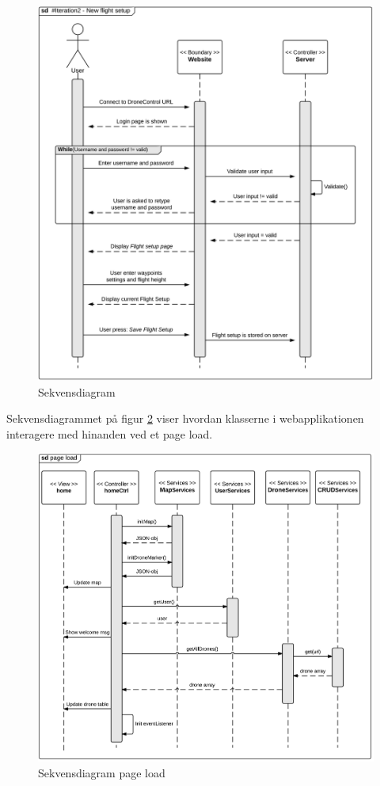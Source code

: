 \begin{figure}[H]
	\centering
	\includegraphics[width=1\textwidth]{Billeder/sekvens/sekvens_iteration2_1}
	\caption{Sekvensdiagram}
	\label{fig:Sekvens_diagram_iteration2_1}
\end{figure}


\newpage

Sekvensdiagrammet på figur \ref{fig:page_load} viser hvordan klasserne i webapplikationen interagere med hinanden ved et page load. 

\begin{figure}[H]
	\centering
	\includegraphics[width=1\textwidth]{Billeder/sekvens/sd_page_load.png}
	\caption{Sekvensdiagram page load}
	\label{fig:page_load}
\end{figure}

